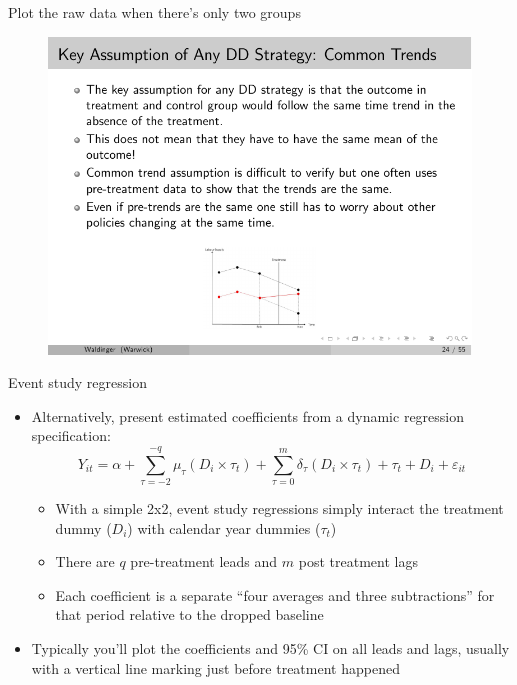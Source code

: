 \documentclass{beamer}
\begin{document}
\begin{frame}{Plot the raw data when there's only two groups}

	\begin{figure}
	\includegraphics[scale=2.5]{./lecture_includes/waldinger_dd_6.pdf}
	\end{figure}

\end{frame}


\begin{frame}{Event study regression}
	
	\begin{itemize}
	\item Alternatively, present estimated coefficients from a dynamic regression specification:
 $$Y_{it} = \alpha + \sum_{\tau=-2}^{-q}\mu_{\tau} (D_i \times \tau_t) + \sum_{\tau=0}^m\delta_{\tau} (D_i \times \tau_t) + \tau_t + D_i + \varepsilon_{it}$$
		\begin{itemize}
		\item With a simple 2x2, event study regressions simply interact the treatment dummy ($D_i$) with calendar year dummies ($\tau_t$)
		\item There are $q$ pre-treatment leads and $m$ post treatment lags 
		\item Each coefficient is a separate ``four averages and three subtractions'' for that period relative to the dropped baseline
		\end{itemize}
\item  Typically you'll plot the coefficients and 95\% CI on all leads and lags, usually with a vertical line marking just before treatment happened
	\end{itemize}
\end{frame}
\end{document}
